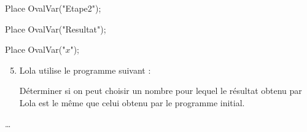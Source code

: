 \begin{exercice*}
\begin{minipage}{0.35\linewidth}
{{        \smallskip
        \begin{Scratch}[Echelle=0.7]
            Place OvalVar("Etape2");
        \end{Scratch}

        \smallskip
        \begin{Scratch}[Echelle=0.7]
            Place OvalVar("Resultat");
        \end{Scratch}

        \smallskip
        \begin{Scratch}[Echelle=0.7]
            Place OvalVar("$x$");
        \end{Scratch}
        }
        }
    \end{minipage}
    \begin{enumerate}
        \setcounter{enumi}{4}
        \item Lola utilise le programme suivant :
        
        \begin{minipage}{0.5\linewidth}
        \end{minipage}

        \smallskip
        Déterminer si on peut choisir un nombre pour lequel le résultat obtenu par Lola est le même que celui obtenu par le programme initial.
    \end{enumerate}
\end{exercice*}
\begin{corrige}
    \dots
\end{corrige}

